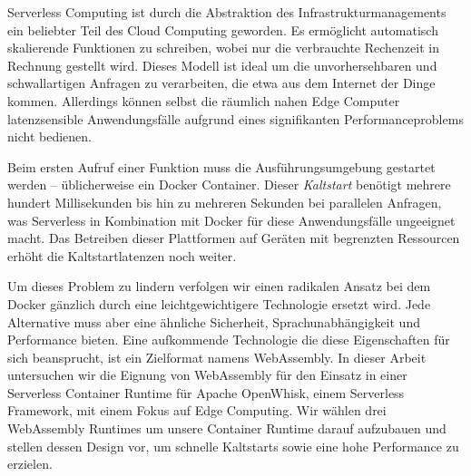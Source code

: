 \documentclass[draft, final, x11names, svgnames]{template/vutinfth} %
\begin{document}
\frontmatter %

\addstatementpage

\begin{danksagung*}
\end{danksagung*}

\begin{acknowledgements*}
\end{acknowledgements*}

\begin{kurzfassung}

Serverless Computing ist durch die Abstraktion des Infrastrukturmanagements ein beliebter Teil des Cloud Computing geworden. Es ermöglicht automatisch skalierende Funktionen zu schreiben, wobei nur die verbrauchte Rechenzeit in Rechnung gestellt wird. Dieses Modell ist ideal um die unvorhersehbaren und schwallartigen Anfragen zu verarbeiten, die etwa aus dem Internet der Dinge kommen. Allerdings können selbst die räumlich nahen Edge Computer latenzsensible Anwendungsfälle aufgrund eines signifikanten Performanceproblems nicht bedienen.

Beim ersten Aufruf einer Funktion muss die Ausführungsumgebung gestartet werden -- üblicherweise ein Docker Container. Dieser \emph{Kaltstart} benötigt mehrere hundert Millisekunden bis hin zu mehreren Sekunden bei parallelen Anfragen, was Serverless in Kombination mit Docker für diese Anwendungsfälle ungeeignet macht. Das Betreiben dieser Plattformen auf Geräten mit begrenzten Ressourcen erhöht die Kaltstartlatenzen noch weiter.

Um dieses Problem zu lindern verfolgen wir einen radikalen Ansatz bei dem Docker gänzlich durch eine leichtgewichtigere Technologie ersetzt wird. Jede Alternative muss aber eine ähnliche Sicherheit, Sprachunabhängigkeit und Performance bieten. Eine aufkommende Technologie die diese Eigenschaften für sich beansprucht, ist ein Zielformat namens WebAssembly. In dieser Arbeit untersuchen wir die Eignung von WebAssembly für den Einsatz in einer Serverless Container Runtime für Apache OpenWhisk, einem Serverless Framework, mit einem Fokus auf Edge Computing. Wir wählen drei WebAssembly Runtimes um unsere Container Runtime darauf aufzubauen und stellen dessen Design vor, um schnelle Kaltstarts sowie eine hohe Performance zu erzielen.


\end{kurzfassung}
\end{document}
